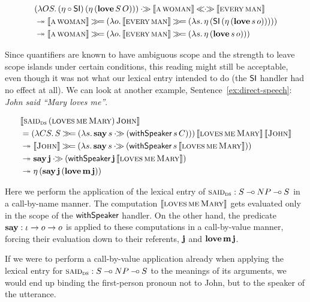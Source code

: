 \begin{align*}
& (\lam{O S}{\ap{(\eta \circ \SI)}{(\etaE{(\app{\obj{love}}{S}{O})})}}) \apr
  \sem{\ap{\abs{a}}{\abs{woman}}} \aplr \sem{\ap{\abs{every}}{\abs{man}}} \\
&\tto \sem{\ap{\abs{a}}{\abs{woman}}} \hsbind (\lam{o}{
      \sem{\ap{\abs{every}}{\abs{man}}} \hsbind (\lam{s}{
      \etaE{(\ap{\SI}{(\etaE{(\app{\obj{love}}{s}{o})})})}})}) \\
&\tto \sem{\ap{\abs{a}}{\abs{woman}}} \hsbind (\lam{o}{
      \sem{\ap{\abs{every}}{\abs{man}}} \hsbind (\lam{s}{
      \etaE{(\app{\obj{love}}{s}{o})}})})
\end{align*}

Since quantifiers are known to have ambiguous scope and the strength to
leave scope islands under certain conditions, this reading might still be
acceptable, even though it was not what our lexical entry intended to do
(the $\textsf{SI}$ handler had no effect at all). We can look at another example,
Sentence~\ref{ex:direct-speech}: \emph{John said ``Mary loves me''}.

\begin{align*}
& \sem{\app{\abs{said}_{\abs{ds}}}{(\app{\abs{loves}}{\abs{me}}{\abs{Mary}})}{\abs{John}}} \\
&= \app{(\lam{C S}{S \hsbind (\lam{s}{\ap{\obj{say}}{s} \apr (\app{\withSpeaker}{s}{C})})})}
       {\sem{\app{\abs{loves}}{\abs{me}}{\abs{Mary}}}}{\sem{\abs{John}}} \\
&\tto \sem{\abs{John}} \hsbind (\lam{s}{\ap{\obj{say}}{s} \apr (\app{\withSpeaker}{s}{\sem{\app{\abs{loves}}{\abs{me}}{\abs{Mary}}}})}) \\
&\tto \ap{\obj{say}}{\obj{j}} \apr (\app{\withSpeaker}{\obj{j}}{\sem{\app{\abs{loves}}{\abs{me}}{\abs{Mary}}}}) \\
&\tto \etaE{(\app{\obj{say}}{\obj{j}}{(\app{\obj{love}}{\obj{m}}{\obj{j}})})}
\end{align*}

Here we perform the application of the lexical entry of
$\textsc{said}_{\textsc{ds}} : S \mathbin{{-}\mkern-3.5mu{\circ}} NP \mathbin{{-}\mkern-3.5mu{\circ}} S$ in a call-by-name manner. The
computation $\llbracket \textsc{loves}\,\textsc{me}\,\textsc{Mary} \rrbracket$ gets evaluated
only in the scope of the $\textsf{withSpeaker}$ handler. On the other hand, the
predicate $\textbf{say} : \iota \to o \to o$ is applied to these computations
in a call-by-value manner, forcing their evaluation down to their
referents, $\textbf{j}$ and $\textbf{love}\,\textbf{m}\,\textbf{j}$.

If we were to perform a call-by-value application already when applying the
lexical entry for $\textsc{said}_{\textsc{ds}} : S \mathbin{{-}\mkern-3.5mu{\circ}} NP \mathbin{{-}\mkern-3.5mu{\circ}} S$ to the
meanings of its arguments, we would end up binding the first-person pronoun
not to John, but to the speaker of the utterance.


